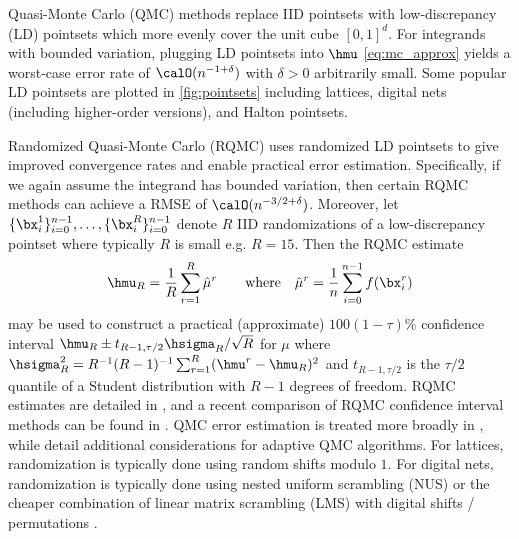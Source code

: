 \documentclass[acmsmall]{acmart}
\begin{document}
Quasi-Monte Carlo (QMC) methods \citep{niederreiter.qmc_book,dick.digital_nets_sequences_book,kroese.handbook_mc_methods,dick2022lattice,lemieux2009monte,sloan1994lattice} replace IID pointsets with low-discrepancy (LD) pointsets which more evenly cover the unit cube $[0,1]^d$. For integrands with bounded variation, plugging LD pointsets into $\hmu$ \eqref{eq:mc_approx} yields a worst-case error rate of $\calO(n^{-1+\delta})$ with $\delta>0$ arbitrarily small. Some popular LD pointsets are plotted in \cref{fig:pointsets} including lattices, digital nets (including higher-order versions), and Halton pointsets.

Randomized Quasi-Monte Carlo (RQMC) uses randomized LD pointsets to give improved convergence rates and enable practical error estimation. Specifically, if we again assume the integrand has bounded variation, then certain RQMC methods can achieve a RMSE of $\calO(n^{-3/2+\delta})$. Moreover, let $\{\bx_i^1\}_{i=0}^{n-1}, \dots, \{\bx_i^R\}_{i=0}^{n-1}$ denote $R$ IID randomizations of a low-discrepancy pointset where typically $R$ is small e.g. $R=15$. Then the RQMC estimate 
\begin{equation}
    \hmu_R = \frac{1}{R} \sum_{r=1}^R \hat{\mu}^r \qquad \text{where} \quad \hat{\mu}^r = \frac{1}{n} \sum_{i=0}^{n-1} f(\bx_i^r)
    \label{eq:RQMC}
\end{equation}
may be used to construct a practical (approximate) $100(1-\tau)\%$ confidence interval $\hmu_R \pm t_{R-1,\tau/2} \hsigma_R/\sqrt{R}$ for $\mu$ where $\hsigma_R^2 = R^{-1}(R-1)^{-1} \sum_{r=1}^R (\hmu^r - \hmu_R)^2$ and $t_{R-1,\tau/2}$ is the $\tau/2$ quantile of a Student distribution with $R-1$ degrees of freedom. RQMC estimates are detailed in \citep[Chapter 17]{owen.mc_book}, and a recent comparison of RQMC confidence interval methods can be found in \citep{l2023confidence}.  QMC error estimation is treated more broadly in \citep{owen2024error}, while \citep{clancy2014cost,adaptive_qmc,clancy2014cost} detail additional considerations for adaptive QMC algorithms. For lattices, randomization is typically done using random shifts modulo $1$. For digital nets, randomization is typically done using nested uniform scrambling (NUS) or the cheaper combination of linear matrix scrambling (LMS) with digital shifts / permutations \citep{owen.variance_alternative_scrambles_digital_net,owen_halton,owen.gain_coefficients_scrambled_halton}.
\end{document}
